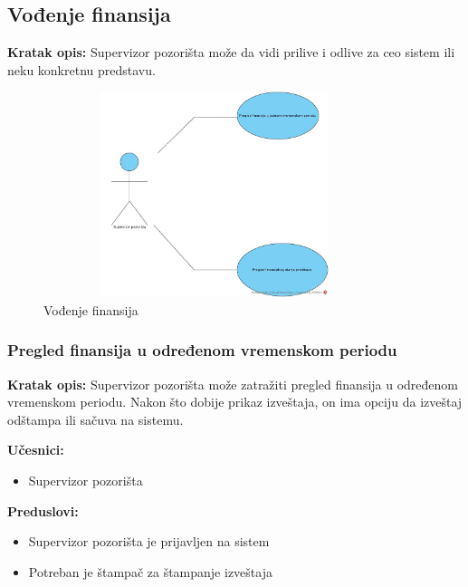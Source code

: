 \documentclass[a4paper]{article}
\begin{document}

\subsection{Vođenje finansija}

 \noindent\textbf{Kratak opis:} Supervizor pozorišta može da vidi prilive i odlive za ceo sistem ili
        neku konkretnu predstavu. 

\begin{figure}[H]
  \begin{center}
      \includegraphics[width=100mm,height=60mm]{../images/usecase_vodjenje_finansija.jpg}
  \end{center}
  \caption{Vođenje finansija}
  \label{usecase_vodjenje_finansija}
\end{figure}

\subsubsection{Pregled finansija u određenom vremenskom periodu}
\noindent\textbf{Kratak opis:} Supervizor pozorišta može zatražiti pregled finansija
u određenom vremenskom periodu. Nakon što dobije prikaz izveštaja, on ima opciju da izveštaj
odštampa ili sačuva na sistemu.

\noindent\textbf{Učesnici:} 
\begin{itemize}
  \item Supervizor pozorišta
\end{itemize}

\noindent\textbf{Preduslovi:} 
\begin{itemize}
  \item Supervizor pozorišta je prijavljen na sistem
  \item Potreban je štampač za štampanje izveštaja
\end{itemize}
\end{document}
